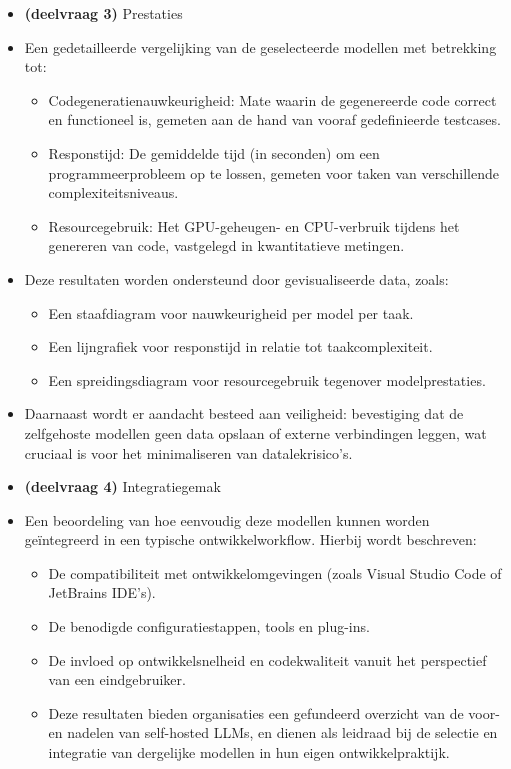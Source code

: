 \begin{itemize}
    \item \textbf{(deelvraag 3)} Prestaties
    \item Een gedetailleerde vergelijking van de geselecteerde modellen met betrekking tot:
    \begin{itemize}
        \item Codegeneratienauwkeurigheid: Mate waarin de gegenereerde code correct en functioneel is, gemeten aan de hand van vooraf gedefinieerde testcases.
        \item Responstijd: De gemiddelde tijd (in seconden) om een programmeerprobleem op te lossen, gemeten voor taken van verschillende complexiteitsniveaus.
        \item Resourcegebruik: Het GPU-geheugen- en CPU-verbruik tijdens het genereren van code, vastgelegd in kwantitatieve metingen.
    \end{itemize}
    \item Deze resultaten worden ondersteund door gevisualiseerde data, zoals:
    \begin{itemize}
        \item Een staafdiagram voor nauwkeurigheid per model per taak.
        \item Een lijngrafiek voor responstijd in relatie tot taakcomplexiteit.
        \item Een spreidingsdiagram voor resourcegebruik tegenover modelprestaties.
    \end{itemize}
    \item Daarnaast wordt er aandacht besteed aan veiligheid: bevestiging dat de zelfgehoste modellen geen data opslaan of externe verbindingen leggen, wat cruciaal is voor het minimaliseren van datalekrisico’s.
    
    \item \textbf{(deelvraag 4)} Integratiegemak
    \item Een beoordeling van hoe eenvoudig deze modellen kunnen worden geïntegreerd in een typische ontwikkelworkflow. Hierbij wordt beschreven:
    \begin{itemize}
        \item De compatibiliteit met ontwikkelomgevingen (zoals Visual Studio Code of JetBrains IDE’s).
        \item De benodigde configuratiestappen, tools en plug-ins.
        \item De invloed op ontwikkelsnelheid en codekwaliteit vanuit het perspectief van een eindgebruiker.
    \item Deze resultaten bieden organisaties een gefundeerd overzicht van de voor- en nadelen van self-hosted LLMs, en dienen als leidraad bij de selectie en integratie van dergelijke modellen in hun eigen ontwikkelpraktijk.
    \end{itemize}
\end{itemize}

